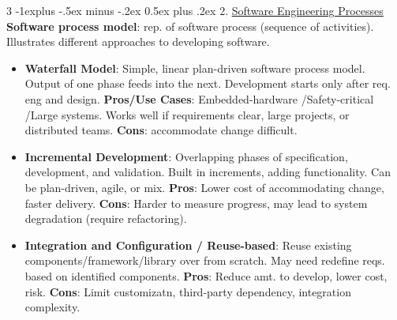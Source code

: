 \documentclass[a4paper, 10pt, landscape]{article}
\makeatletter
\renewcommand{\subsection}{\@startsection{subsection}{2}{0mm}%
                                {-1explus -.5ex minus -.2ex}%
                                {0.5ex plus .2ex}%
                                {\normalfont\normalsize\bfseries}}
\makeatother
\begin{document}
\begin{multicols*}{3}
\subsection{2. \underline{Software Engineering Processes}}
\textbf{Software process model}: rep. of software process (sequence of activities). Illustrates different approaches to developing software.
\begin{itemize}
	\item \textbf{Waterfall Model}:  Simple, linear plan-driven software process model. Output of one phase feeds into the next. Development starts only after req. eng and design. \textbf{Pros/Use Cases}: Embedded-hardware /Safety-critical /Large systems. Works well if requirements clear, large projects, or distributed teams. \textbf{Cons}: accommodate change difficult.
	\item \textbf{Incremental Development}: Overlapping phases of specification, development, and validation. Built in increments, adding functionality. Can be plan-driven, agile, or mix. \textbf{Pros}: Lower cost of accommodating change, faster delivery. \textbf{Cons}: Harder to measure progress, may lead to system degradation (require refactoring). 
	\item \textbf{Integration and Configuration / Reuse-based}: Reuse existing components/framework/library over from scratch. May need redefine reqs. based on identified components. \textbf{Pros}: Reduce amt. to develop, lower cost, risk. \textbf{Cons}: Limit customizatn, third-party dependency, integration complexity.  
\end{itemize}



\end{multicols*}
\end{document}
